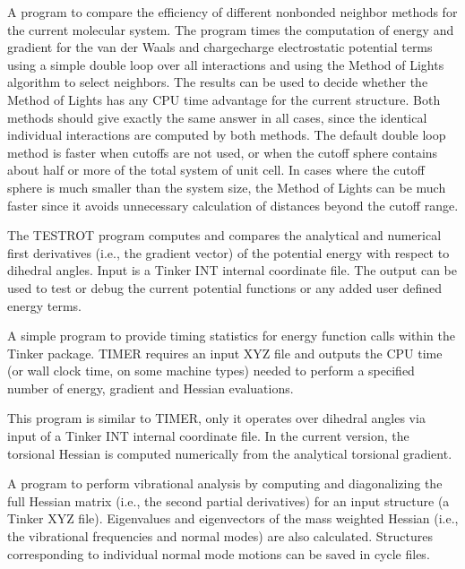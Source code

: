 \documentclass[letterpaper,11pt,english]{sphinxmanual}
\begin{document}

A program to compare the efficiency of different nonbonded neighbor methods for the current molecular system. The program times the computation of energy and gradient for the van der Waals and charge\sphinxhyphen{}charge electrostatic potential terms using a simple double loop over all interactions and using the Method of Lights algorithm to select neighbors. The results can be used to decide whether the Method of Lights has any CPU time advantage for the current structure. Both methods should give exactly the same answer in all cases, since the identical individual interactions are computed by both methods. The default double loop method is faster when cutoffs are not used, or when the cutoff sphere contains about half or more of the total system of unit cell. In cases where the cutoff sphere is much smaller than the system size, the Method of Lights can be much faster since it avoids unnecessary calculation of distances beyond the cutoff range.


The TESTROT program computes and compares the analytical and numerical first derivatives (i.e., the gradient vector) of the potential energy with respect to dihedral angles. Input is a Tinker INT internal coordinate file. The output can be used to test or debug the current potential functions or any added user defined energy terms.


A simple program to provide timing statistics for energy function calls within the Tinker package. TIMER requires an input XYZ file and outputs the CPU time (or wall clock time, on some machine types) needed to perform a specified number of energy, gradient and Hessian evaluations.


This program is similar to TIMER, only it operates over dihedral angles via input of a Tinker INT internal coordinate file. In the current version, the torsional Hessian is computed numerically from the analytical torsional gradient.


A program to perform vibrational analysis by computing and diagonalizing the full Hessian matrix (i.e., the second partial derivatives) for an input structure (a Tinker XYZ file). Eigenvalues and eigenvectors of the mass weighted Hessian (i.e., the vibrational frequencies and normal modes) are also calculated. Structures corresponding to individual normal mode motions can be saved in cycle files.
\end{document}
